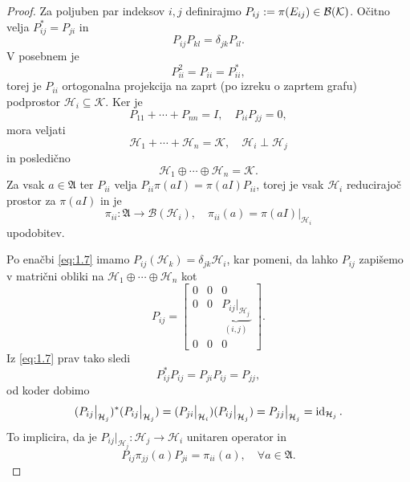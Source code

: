 \begin{proof}
    Za poljuben par indeksov $i, j$ definirajmo $P_{ij} := \pi (E_{ij}) \in \operatorname{\mathcal{B} (\mathcal{K})}$.
    Očitno velja $P_{ij} ^* = P_{ji}$ in 
    \begin{equation}\label{eq:1.7}
       P_{ij} P_{kl} = \delta_{jk} P_{il}. 
    \end{equation}
    V posebnem je 
    $$P_{ii} ^2 = P_{ii} = P_{ii}^*,$$
    torej je $P_{ii}$ ortogonalna projekcija na zaprt (po izreku o zaprtem grafu)
    podprostor $\mathcal{H}_i \subseteq \mathcal{K}$.
    Ker je $$P_{11} + \cdots + P_{nn} = I,\quad P_{ii} P_{jj} = 0,$$
    mora veljati $$\mathcal{H}_1 + \cdots + \mathcal{H}_n = \mathcal{K},\quad \mathcal{H}_i \perp \mathcal{H}_j$$
    in posledično $$\mathcal{H}_1 \oplus \cdots \oplus \mathcal{H}_n = \mathcal{K}.$$
    Za vsak $a \in \mathfrak{A}$ ter $P_{ii}$ velja $P_{ii} \pi(aI) = \pi(aI) P_{ii}$, torej je vsak $\mathcal{H}_i$
    reducirajoč prostor za $\pi(aI)$ in je 
    $$\pi_{ii}: \mathfrak{A} \to \mathcal{B}(\mathcal{H}_i),\quad \pi_{ii} (a) = \pi(aI) \big|_{\mathcal{H}_i}$$
    upodobitev.

    Po enačbi \eqref{eq:1.7} imamo $P_{ij} (\mathcal{H}_k) = \delta_{jk} \mathcal{H}_{i}$, 
    kar pomeni, da lahko $P_{ij}$ zapišemo v matrični obliki na $\mathcal{H}_1 \oplus \cdots \oplus \mathcal{H}_n$ kot
    $$P_{ij} = \begin{bmatrix}
    0 & 0 & 0 \\
    0  & 0 & \underbrace{P_{ij}\big|_{\mathcal{H}_j}}_{(i, j)} \\
     0 & 0 & 0 
 \end{bmatrix}.$$
    Iz \eqref{eq:1.7} prav tako sledi $$P_{ij} ^* P_{ij} = P_{ji} P_{ij} = P_{jj},$$
    od koder dobimo
    $$(P_{ij}\big|_{\mathcal{H}_j})^* (P_{ij}\big|_{\mathcal{H}_j}) = (P_{ji}\big|_{\mathcal{H}_i}) (P_{ij}\big|_{\mathcal{H}_j}) = P_{jj} \big|_{\mathcal{H}_j} = \operatorname{id}_{\mathcal{H}_j}.$$
    To implicira, da je $P_{ij}\big|_{\mathcal{H}_j}: \mathcal{H}_j \to \mathcal{H}_i$ unitaren operator
    in $$P_{ij} \pi_{jj}(a) P_{ji} = \pi_{ii} (a),\quad \forall a \in \mathfrak{A}.$$


\end{proof}
